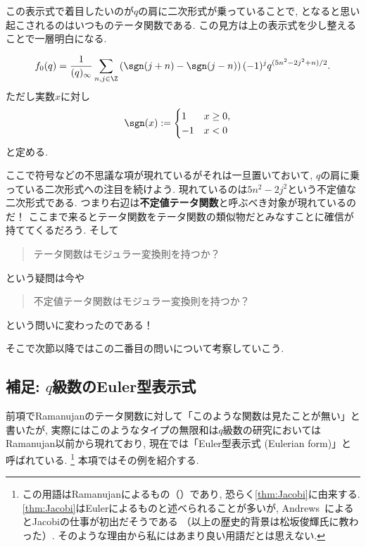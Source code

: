 \documentclass[11pt,b5paper,oneside,lualatex]{ltjsarticle} %
\numberwithin{equation}{section} %
\begin{document}
この表示式で着目したいのが$ q $の肩に二次形式が乗っていることで, となると思い起こされるのはいつものテータ関数である. 
この見方は上の表示式を少し整えることで一層明白になる. 

\begin{cor} \label{cor:mock_indefinite}
	\[
	f_0 (q) = \frac{1}{(q)_\infty}
	\sum_{n, j \in \Z} \left( \sgn(j+n) - \sgn(j-n) \right) (-1)^j q^{(5n^2 - 2j^2 + n)/2}.
	\]	
	ただし実数$ x $に対し
	\begin{align}
		\sgn(x) &:= 
		\begin{cases}
			1 & x \ge 0, \\
			-1 & x < 0
		\end{cases}
	\end{align}
	と定める. 
\end{cor}

ここで符号などの不思議な項が現れているがそれは一旦置いておいて, $ q $の肩に乗っている二次形式への注目を続けよう. 
現れているのは$ 5n^2 - 2j^2 $という不定値な二次形式である. 
つまり右辺は\textbf{不定値テータ関数}と呼ぶべき対象が現れているのだ！
ここまで来るとテータ関数をテータ関数の類似物だとみなすことに確信が持ててくるだろう. 
そして
\begin{quote}
	\centering
	テータ関数はモジュラー変換則を持つか？
\end{quote}
という疑問は今や
\begin{quote}
	\centering
	不定値テータ関数はモジュラー変換則を持つか？
\end{quote}
という問いに変わったのである！

そこで次節以降ではこの二番目の問いについて考察していこう. 


\subsection{補足: $ q $級数のEuler型表示式} \label{subsec:Eulerian_form}


前項でRamanujanのテータ関数に対して「このような関数は見たことが無い」と書いたが, 実際にはこのようなタイプの無限和は$ q $級数の研究においてはRamanujan以前から現れており, 現在では「Euler型表示式 (Eulerian form)」と呼ばれている. 
\footnote{この用語はRamanujanによるもの（\cite[119ページ]{魅惑}）であり, 恐らく\cref{thm:Jacobi}に由来する. 
	\cref{thm:Jacobi}はEulerによるものと述べられることが多いが, Andrews~\cite{Andrews_combi}によるとJacobiの仕事が初出だそうである
	（以上の歴史的背景は松坂俊輝氏に教わった）. 
	そのような理由から私にはあまり良い用語だとは思えない. }
本項ではその例を紹介する. 
\end{document}

